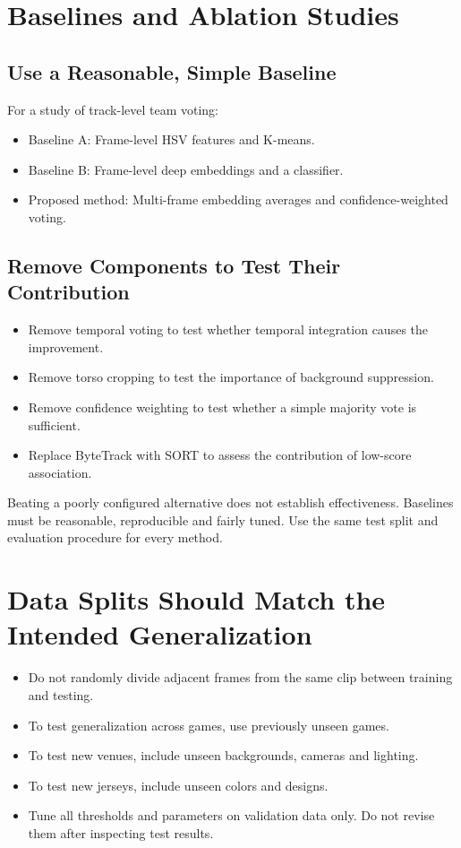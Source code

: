 \documentclass[11pt,a4paper,oneside]{report}
\begin{document}
\section{Baselines and Ablation Studies}

\subsection{Use a Reasonable, Simple Baseline}

For a study of track-level team voting:

\begin{itemize}
  \item Baseline A: Frame-level HSV features and K-means.
  \item Baseline B: Frame-level deep embeddings and a classifier.
  \item Proposed method: Multi-frame embedding averages and confidence-weighted voting.
\end{itemize}

\subsection{Remove Components to Test Their Contribution}

\begin{itemize}
  \item Remove temporal voting to test whether temporal integration causes the improvement.
  \item Remove torso cropping to test the importance of background suppression.
  \item Remove confidence weighting to test whether a simple majority vote is sufficient.
  \item Replace ByteTrack with SORT to assess the contribution of low-score association.
\end{itemize}

\begin{riskBox}
Beating a poorly configured alternative does not establish effectiveness. Baselines must be reasonable, reproducible and fairly tuned. Use the same test split and evaluation procedure for every method.
\end{riskBox}

\section{Data Splits Should Match the Intended Generalization}

\begin{itemize}
  \item Do not randomly divide adjacent frames from the same clip between training and testing.
  \item To test generalization across games, use previously unseen games.
  \item To test new venues, include unseen backgrounds, cameras and lighting.
  \item To test new jerseys, include unseen colors and designs.
  \item Tune all thresholds and parameters on validation data only. Do not revise them after inspecting test results.
\end{itemize}
\end{document}
